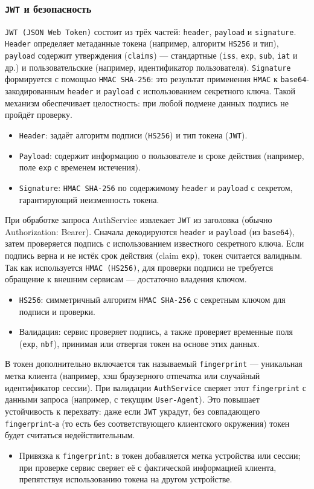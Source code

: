 \subsubsection*{\texttt{JWT} и безопасность}
\texttt{JWT (JSON Web Token)} состоит из трёх частей: \texttt{header}, \texttt{payload} и \texttt{signature}. \texttt{Header} определяет метаданные токена (например, алгоритм \texttt{HS256} и тип), \texttt{payload} содержит утверждения (\texttt{claims}) — стандартные (\texttt{iss}, \texttt{exp}, \texttt{sub}, \texttt{iat} и др.) и пользовательские (например, идентификатор пользователя). \texttt{Signature} формируется с помощью \texttt{HMAC SHA-256}: это результат применения \texttt{HMAC} к \texttt{base64}-закодированным \texttt{header} и \texttt{payload} с использованием секретного ключа. Такой механизм обеспечивает целостность: при любой подмене данных подпись не пройдёт проверку.
\begin{itemize}
    \item \texttt{Header}: задаёт алгоритм подписи (\texttt{HS256}) и тип токена (\texttt{JWT}).
    \item \texttt{Payload}: содержит информацию о пользователе и сроке действия (например, поле \texttt{exp} с временем истечения).
    \item \texttt{Signature}: \texttt{HMAC SHA-256} по содержимому \texttt{header} и \texttt{payload} с секретом, гарантирующий неизменность токена.
\end{itemize}
При обработке запроса AuthService извлекает \texttt{JWT} из заголовка (обычно \\ Authorization: Bearer). Сначала декодируются \texttt{header} и \texttt{payload} (из \texttt{base64}), затем проверяется подпись с использованием известного секретного ключа. Если подпись верна и не истёк срок действия (claim \texttt{exp}), токен считается валидным. Так как используется \texttt{HMAC (HS256)}, для проверки подписи не требуется обращение к внешним сервисам — достаточно владения ключом.
\begin{itemize}
    \item \texttt{HS256}: симметричный алгоритм \texttt{HMAC SHA-256} с секретным ключом для подписи и проверки.
    \item Валидация: сервис проверяет подпись, а также проверяет временные поля (\texttt{exp}, \texttt{nbf}), принимая или отвергая токен на основе этих данных.
\end{itemize}
В токен дополнительно включается так называемый \texttt{fingerprint} — уникальная метка клиента (например, хэш браузерного отпечатка или случайный идентификатор сессии). При валидации \texttt{AuthService} сверяет этот \texttt{fingerprint} с данными запроса (например, с текущим \texttt{User-Agent}). Это повышает устойчивость к перехвату: даже если \texttt{JWT} украдут, без совпадающего \texttt{fingerprint}-а (то есть без соответствующего клиентского окружения) токен будет считаться недействительным.
\begin{itemize}
    \item Привязка к \texttt{fingerprint}: в токен добавляется метка устройства или сессии; при проверке сервис сверяет её с фактической информацией клиента, препятствуя использованию токена на другом устройстве.
\end{itemize}

